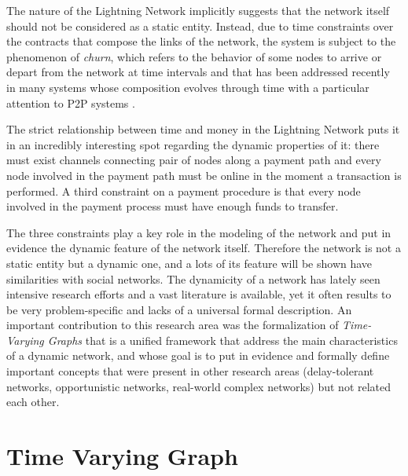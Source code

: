 	The nature of the Lightning Network implicitly suggests that the network itself should not be considered as a static entity. Instead, due to time constraints over the contracts that compose the links of the network, the system is subject to the phenomenon of \textit{churn}, which refers to the behavior of some nodes to arrive or depart from the network at time intervals and that has been addressed recently in many systems whose composition evolves through time \cite{Baldoni2010} \cite{Ko2008} with a particular attention to P2P systems \cite{Liben-Nowell2002} \cite{Mostefaoui}. 
	
	The strict relationship between time and money in the Lightning Network puts it in an incredibly interesting spot regarding the dynamic properties of it: there must exist channels connecting pair of nodes along a payment path and every node involved in the payment path must be online in the moment a transaction is performed. A third constraint on a payment procedure is that every node involved in the payment process must have enough funds to transfer.
	
	The three constraints play a key role in the modeling of the network and put in evidence the dynamic feature of the network itself. Therefore the network is not a static entity but a dynamic one, and a lots of its feature will be shown have similarities with social networks. The dynamicity of a network has lately seen intensive research efforts and a vast literature is available, yet it often results to be very problem-specific and lacks of a universal formal description. An important contribution to this research area was the formalization of \textit{Time-Varying Graphs}\cite{Casteigts2012} that is a unified framework that address the main characteristics of a dynamic network, and whose goal is to put in evidence and formally define important concepts that were present in other research areas (delay-tolerant networks, opportunistic networks, real-world complex networks) but not related each other.
	
	
	\section{Time Varying Graph}

